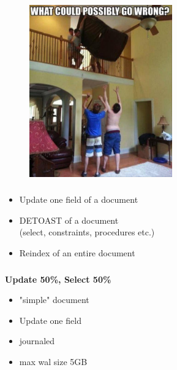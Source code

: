 \documentclass[usenames,dvipsnames, 18pt, compress, aspectratio=169]{beamer}
\begin{document}
\begin{frame}
    \frametitle{}
    \begin{center}
    \begin{figure}
        \includegraphics[width=0.55\textwidth,center]{wrong.jpg}
    \end{figure}
    \end{center}
\end{frame}

\begin{frame}
    \frametitle{}
    \begin{center}
        \begin{itemize}[label={\MVRightarrow}]
            \item Update one field of a document
            \item DETOAST of a document\\
                (select, constraints, procedures etc.)
            \item Reindex of an entire document
        \end{itemize}
    \end{center}
\end{frame}

\begin{frame}
    \frametitle{}
    \begin{center}
        \textbf{Update 50\%, Select 50\%}
        \begin{itemize}[label={}]
            \item "simple" document
            \item Update one field
            \item journaled
            \item max wal size 5GB
        \end{itemize}
    \end{center}
\end{frame}
\end{document}
